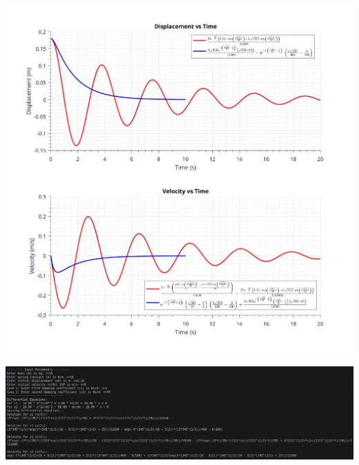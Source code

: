\documentclass[a4paper, 12pt]{report}
\def\link{blue!50!black}
\begin{document}

\includegraphics[width=1\textwidth]{main/graphs_images/damped_oscillation.jpeg}
\begin{center}
    \includegraphics[width=1\textwidth]{main/graphs_images/3screen.png}
\end{center}
\newpage
\end{document}
